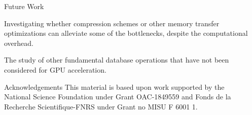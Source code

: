 \documentclass[final]{beamer}
\newlength{\sepwidth}
\newlength{\colwidth}
\newcommand{\separatorcolumn}{\begin{column}{\sepwidth}\end{column}}
\begin{document}
\begin{frame}[t]
\begin{columns}[t]
\begin{column}{\colwidth}
\begin{block}{Future Work}
\begin{description}[font=$\bullet$~\normalfont\scshape\color{red!50!black}]
\item Investigating whether compression schemes or other memory transfer optimizations can alleviate some of the bottlenecks, despite the computational overhead.
\item The study of other fundamental database operations that have not been considered for GPU acceleration.
\end{description}

\end{block}

\begin{block}{Acknowledgements}
This material is based upon work supported by the National Science Foundation under Grant OAC-1849559 and Fonds de la Recherche Scientifique-FNRS under Grant no MISU F 6001 1.
\end{block}

\end{column}

\separatorcolumn
\end{columns}
\end{frame}
\end{document}
